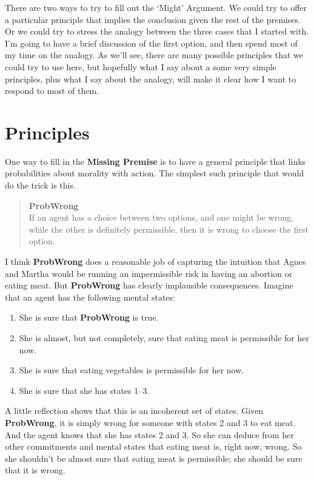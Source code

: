 There are two ways to try to fill out the `Might' Argument. We could try to offer a particular principle that implies the conclusion given the rest of the premises. Or we could try to stress the analogy between the three cases that I started with. I'm going to have a brief discussion of the first option, and then spend most of my time on the analogy. As we'll see, there are many possible principles that we could try to use here, but hopefully what I say about a some very simple principles, plus what I say about the analogy, will make it clear how I want to respond to most of them.

\section{Principles}
\label{principles}

One way to fill in the \textbf{Missing Premise} is to have a general principle that links probabilities about morality with action. The simplest such principle that would do the trick is this.

\begin{quote}

\textbf{ProbWrong}\\
If an agent has a choice between two options, and one might be wrong, while the other is definitely permissible, then it is wrong to choose the first option.
\end{quote}
I think \textbf{ProbWrong} does a reasonable job of capturing the intuition that Agnes and Martha would be running an impermissible risk in having an abortion or eating meat. But \textbf{ProbWrong} has clearly implausible consequences. Imagine that an agent has the following mental states:

\begin{enumerate}
\item She is sure that \textbf{ProbWrong} is true.

\item She is almost, but not completely, sure that eating meat is permissible for her now.

\item She is sure that eating vegetables is permissible for her now.

\item She is sure that she has states 1--3.

\end{enumerate}
A little reflection shows that this is an incoherent set of states. Given \textbf{ProbWrong}, it is simply wrong for someone with states 2 and 3 to eat meat. And the agent knows that she has states 2 and 3. So she can deduce from her other commitments and mental states that eating meat is, right now, wrong. So she shouldn't be almost sure that eating meat is permissible; she should be sure that it is wrong.

